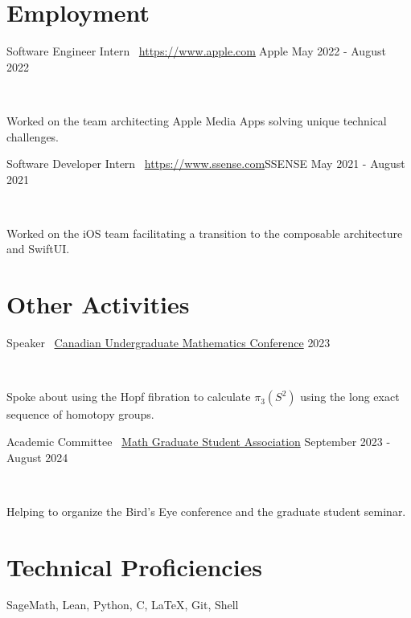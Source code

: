 \documentclass[]{style}
\begin{document}
\section{Employment}

\begin{entrylist}

\vspace{1mm}

\entry
{Software Engineer Intern \ {\normalfont \url{https://www.apple.com}{Apple}}}
{May 2022 - August 2022}
{ ~ \vspace{-2.5mm}

Worked on the team architecting Apple Media Apps solving unique technical challenges. }

\entry
{Software Developer Intern \ {\normalfont \url{https://www.ssense.com}{SSENSE}}}
{May 2021 - August 2021}
{ ~ \vspace{-2.5mm}

Worked on the iOS team facilitating a transition to the composable architecture and SwiftUI.}

\end{entrylist}

\section{Other Activities}

\begin{entrylist}

\vspace{1mm}

\entry
{Speaker \ {\normalfont \underline{Canadian Undergraduate Mathematics Conference}}}
{2023}
{ ~ \vspace{-2.5mm}

Spoke about using the Hopf fibration to calculate $\pi_3(S^2)$ using the long exact sequence of homotopy groups.}

\entry
{Academic Committee \ {\normalfont \underline{Math Graduate Student Association}}}
{September 2023 - August 2024}
{ ~ \vspace{-2.5mm}

Helping to organize the Bird's Eye conference and the graduate student seminar.}

\end{entrylist}

\section{Technical Proficiencies}

SageMath, Lean, Python, C, \LaTeX, Git, Shell
\end{document}
